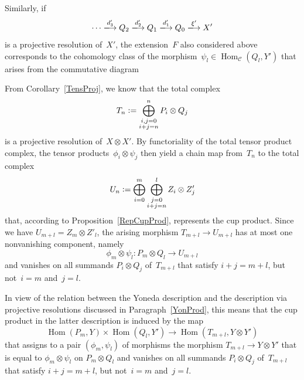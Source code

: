 \documentclass[12pt]{article}
\theoremstyle{definition}
\theoremstyle{break}
\newcommand{\CC}{\mathcal{C}}
\DeclareMathOperator\Hom{Hom}
\DeclareMathOperator\id{id}
\renewcommand{\1}{\mathbbm{1}}
\newcommand{\ot}{\mathbin{\otimes}}
\newcommand{\deq}{\vcentcolon =}
\begin{document}
Similarly, if
\[\cdots \xlongrightarrow{d'_3} Q_2 \xlongrightarrow{d'_2} Q_1 \xlongrightarrow{d'_1} Q_0
\xlongrightarrow{\xi'} X'\]
is a projective resolution of~$X'$, the extension~$F$ also considered above corresponds to the cohomology class of the morphism~$\psi_l \in \Hom_{\CC}(Q_l,Y')$ that arises from the commutative diagram
\begin{center}
\end{center}
From Corollary~\ref{TensProj}, we know that the total complex
\[T_n \deq \bigoplus_{\substack{i,j=0 \\i+j=n}}^n P_{i} \ot Q_{j}\]
is a projective resolution of~$X \ot X'$. By functoriality of the total tensor product complex, the tensor products~$\phi_i \ot \psi_j$ then yield a chain map from~$T_n$ to the total complex
\[U_n \deq \bigoplus_{i=0}^m \bigoplus_{\substack{j=0 \\i+j=n}}^l Z_{i} \ot Z'_{j}\]
that, according to Proposition~\ref{RepCupProd}, represents the cup product.
Since we have $U_{m+l} = Z_{m} \ot Z'_{l}$, the arising morphism $T_{m+l} \to U_{m+l}$ has at most one nonvanishing component, namely
$$\phi_m \ot \psi_l \colon P_m \ot Q_l \to U_{m+l}$$
and vanishes on all summands $P_{i} \ot Q_{j}$ of~$T_{m+l}$ that satisfy $i+j=m+l$, but not~$i=m$ and~$j=l$.

In view of the relation between the Yoneda description and the description via projective resolutions discussed in Paragraph~\ref{YonProd}, this means that the cup product in the latter description is induced by the map
$$\Hom(P_m, Y) \times \Hom(Q_l, Y') \rightarrow \Hom(T_{m+l}, Y \ot Y')$$
that assigns to a pair $(\phi_m, \psi_l)$ of morphisms the morphism
$T_{m+l} \to Y \ot Y'$ that is equal to $\phi_m \ot \psi_l$ on $P_m \ot Q_l$
and vanishes on all summands $P_{i} \ot Q_{j}$ of~$T_{m+l}$ that satisfy $i+j=m+l$, but not~$i=m$ and~$j=l$.
\end{document}
